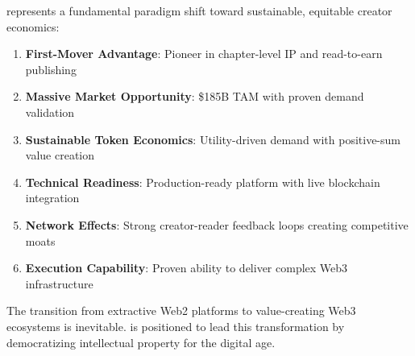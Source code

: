 \storyhouse{} represents a fundamental paradigm shift toward sustainable, equitable creator economics:

\begin{enumerate}
    \item \textbf{First-Mover Advantage}: Pioneer in chapter-level IP and read-to-earn publishing
    \item \textbf{Massive Market Opportunity}: \$185B TAM with proven demand validation
    \item \textbf{Sustainable Token Economics}: Utility-driven demand with positive-sum value creation
    \item \textbf{Technical Readiness}: Production-ready platform with live blockchain integration
    \item \textbf{Network Effects}: Strong creator-reader feedback loops creating competitive moats
    \item \textbf{Execution Capability}: Proven ability to deliver complex Web3 infrastructure
\end{enumerate}

\begin{keypoint}
The transition from extractive Web2 platforms to value-creating Web3 ecosystems is inevitable. \storyhouse{} is positioned to lead this transformation by democratizing intellectual property for the digital age.
\end{keypoint}